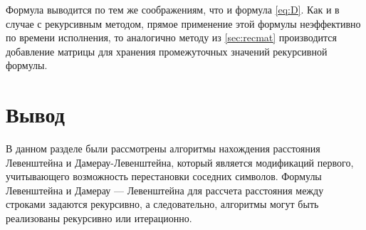 Формула выводится по тем же соображениям, что и формула \eqref{eq:D}.
Как и в случае с рекурсивным методом, прямое применение этой формулы неэффективно по времени исполнения,
то аналогично методу из \eqref{sec:recmat} производится добавление матрицы для хранения промежуточных значений рекурсивной формулы.

\section*{Вывод}
В данном разделе были рассмотрены алгоритмы нахождения расстояния Левенштейна и Дамерау-Левенштейна,
который является модификаций первого, учитывающего возможность перестановки соседних символов.
Формулы Левенштейна и Дамерау — Левенштейна для рассчета расстояния между строками задаются рекурсивно,
а следовательно, алгоритмы могут быть реализованы рекурсивно или итерационно.

\clearpage
